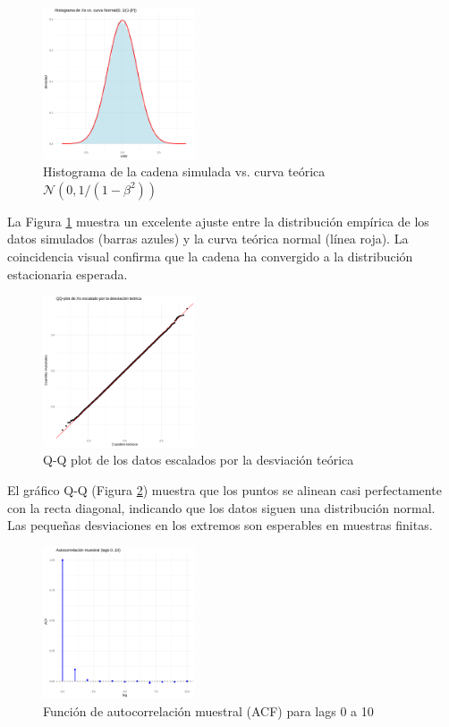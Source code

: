 \documentclass[12pt,a4paper]{article}
\begin{document}
\begin{figure}[h]
\centering
\includegraphics[width=0.4\textwidth]{images/image_1.png}
\caption{Histograma de la cadena simulada vs. curva teórica $\mathcal{N}(0, 1/(1-\beta^2))$}
\label{fig:histograma}
\end{figure}

La Figura \ref{fig:histograma} muestra un excelente ajuste entre la distribución empírica de los datos simulados (barras azules) y la curva teórica normal (línea roja). La coincidencia visual confirma que la cadena ha convergido a la distribución estacionaria esperada. \\

\begin{figure}[h]
\centering
\includegraphics[width=0.4\textwidth]{images/image_2.png}
\caption{Q-Q plot de los datos escalados por la desviación teórica}
\label{fig:qqplot}
\end{figure}

El gráfico Q-Q (Figura \ref{fig:qqplot}) muestra que los puntos se alinean casi perfectamente con la recta diagonal, indicando que los datos siguen una distribución normal. Las pequeñas desviaciones en los extremos son esperables en muestras finitas. \\

\begin{figure}[h]
\centering
\includegraphics[width=0.4\textwidth]{images/image_3.png}
\caption{Función de autocorrelación muestral (ACF) para lags 0 a 10}
\label{fig:acf}
\end{figure}
\end{document}
